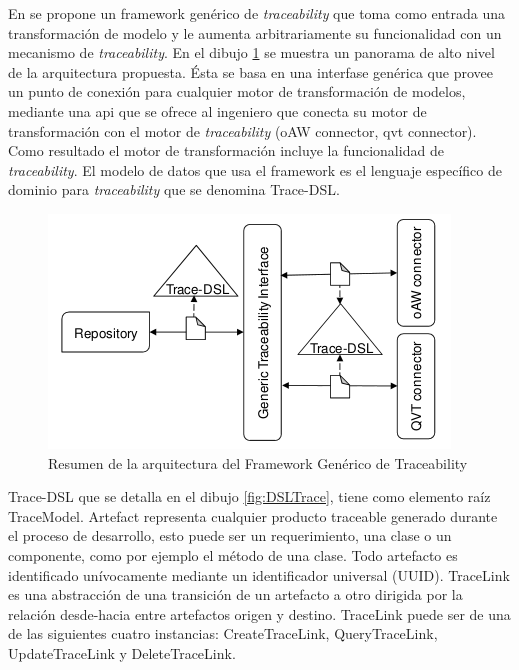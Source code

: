 \documentclass[a4paper,12pt,oneside,spanish]{book}
\begin{document}
En \cite{GrammelKastenholz} se propone un framework genérico de \textit{traceability} que toma como entrada una transformación de modelo y le aumenta arbitrariamente su funcionalidad con un mecanismo de \textit{traceability}. En el dibujo \ref{fig:GenericoArquitectura} se muestra un panorama de alto nivel de la arquitectura propuesta. Ésta se basa en una interfase genérica que provee un punto de conexión para cualquier motor de transformación de modelos, mediante una \gls{api} que se ofrece al ingeniero que conecta su motor de transformación con el motor de \textit{traceability} (oAW connector, \gls{qvt} connector). Como resultado el motor de transformación incluye la funcionalidad de \textit{traceability}. El modelo de datos que usa el framework es el lenguaje específico de dominio para \textit{traceability} que se denomina Trace-DSL.

\begin{figure}[hbtp]
\centering
\includegraphics[scale=.7]{./img/GenericTraceFrame_Arquitectura}
\caption{Resumen de la arquitectura del Framework Genérico de Traceability}
\label{fig:GenericoArquitectura}
\end{figure}


Trace-DSL que se detalla en el dibujo \ref{fig:DSLTrace}, tiene como elemento raíz TraceModel. Artefact representa cualquier producto traceable generado durante el proceso de desarrollo, esto puede ser un requerimiento, una clase o un componente, como por ejemplo el método de una clase. Todo artefacto es identificado unívocamente mediante un identificador universal (UUID). TraceLink es una abstracción de una transición de un artefacto a otro dirigida por la relación desde-hacia entre artefactos origen y destino. TraceLink puede ser de una de las siguientes cuatro instancias: CreateTraceLink, QueryTraceLink, UpdateTraceLink y DeleteTraceLink.
\end{document}
